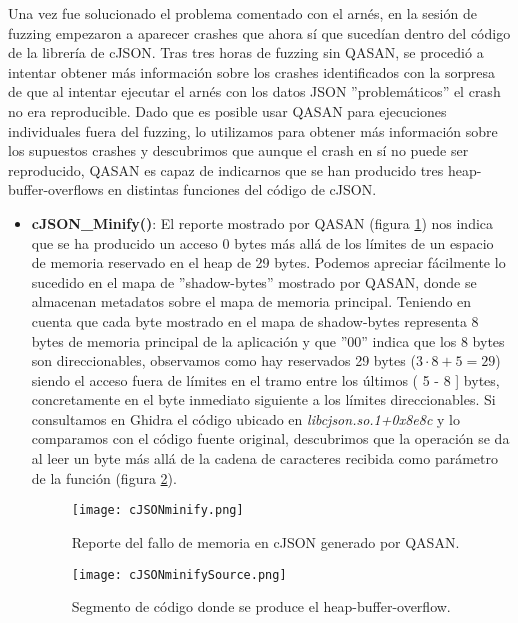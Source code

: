 Una vez fue solucionado el problema comentado con el arnés, en la sesión de fuzzing empezaron a aparecer crashes que ahora sí que sucedían dentro 
del código de la librería de cJSON. Tras tres horas de fuzzing sin QASAN, se procedió a intentar obtener más información sobre los crashes identificados con la 
sorpresa de que al intentar ejecutar el arnés con los datos JSON ''problemáticos'' el crash no era reproducible. Dado que es posible usar QASAN para 
ejecuciones individuales fuera del fuzzing, lo utilizamos para obtener más información sobre los supuestos crashes y descubrimos que aunque el
crash en sí no puede ser reproducido, QASAN es capaz de indicarnos que se han producido tres heap-buffer-overflows en distintas funciones del código 
de cJSON.
\begin{itemize}
    \item \textbf{cJSON\_Minify()}: El reporte mostrado por QASAN (figura \ref{fig:cJSONminify}) nos indica que se ha producido un acceso 0 bytes más allá de los límites de un espacio
    de memoria reservado en el heap de 29 bytes. Podemos apreciar fácilmente lo sucedido en el mapa de ''shadow-bytes'' mostrado por QASAN, donde se 
    almacenan metadatos sobre el mapa de memoria principal. Teniendo en cuenta que cada byte mostrado en el mapa de shadow-bytes representa 8 bytes 
    de memoria principal de la aplicación y que ''00'' indica que los 8 bytes son direccionables, observamos como hay reservados 29 bytes ($3\cdot8 + 5=29$)
    siendo el acceso fuera de límites en el tramo entre los últimos ( 5 - 8 ] bytes, concretamente en el byte inmediato siguiente a los límites 
    direccionables. Si consultamos en Ghidra el código ubicado en \textit{libcjson.so.1+0x8e8c} y lo comparamos con el código fuente original, descubrimos
    que la operación se da al leer un byte más allá de la cadena de caracteres recibida como parámetro de la función (figura \ref{fig:cJSONminifySource}).
    \begin{figure}[H]
        \centering
        \texttt{[image: cJSONminify.png]}
        \caption{Reporte del fallo de memoria en cJSON generado por QASAN.}
        \label{fig:cJSONminify}
    \end{figure}

    \begin{figure}[H]
        \centering
        \texttt{[image: cJSONminifySource.png]}
        \caption{Segmento de código donde se produce el heap-buffer-overflow.}
        \label{fig:cJSONminifySource}
    \end{figure}


\end{itemize}
